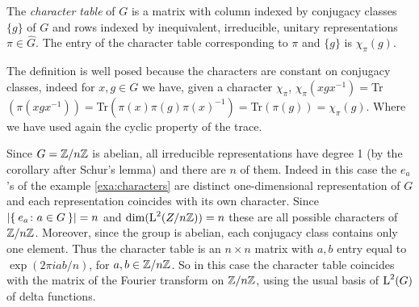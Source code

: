 \begin{defn}
The \emph{character table} of $G$ is a matrix with column indexed by conjugacy classes $\{g\}$ of $G$ and rows indexed by inequivalent, irreducible, unitary representations $\pi \in \hat{G}$. The entry of   the character table corresponding to $\pi$ and $\{g\}$ is $\chi_\pi(g)$.
\end{defn}
\begin{rem}
The definition is well posed because the characters are constant on conjugacy classes, indeed for $x,g\in G$ we have, given a character $\chi_\pi$, $\chi_\pi(xgx^{-1})=$Tr$(\pi(xgx^{-1}))=$Tr$(\pi(x)\pi(g)\pi(x)^{-1})=$Tr$(\pi(g))=\chi_\pi(g)$.
Where we have used again the cyclic property of the trace.
\end{rem}
\begin{exmp}[$\Z/{n\Z}$]
Since $G={\mathbb Z}/{n{\mathbb Z}}$ is abelian, all irreducible representations  have  degree  1 (by the corollary after Schur's lemma)  and  there  are $n$ of them. Indeed in this case  the $e_a$'s of the example \ref{exa:characters}  are  distinct one-dimensional representation of $G$ and each representation coincides with its own character. Since $\lvert\Set{e_a\colon a \in G}\rvert= n $ and $\dim(\operatorname{L}^{2}(Z/{n{\mathbb Z}}))=n$ these are all possible characters of $\Z/{n\Z}$. Moreover, since the group is abelian, each conjugacy class contains only one element. Thus the character table is an $n\times n$ matrix with $a,b$ entry equal to  $\exp(2\pi iab/n)$, for $a,b \in {\mathbb Z}/{n{\mathbb Z}}$. So in this case the character table coincides with the matrix of the Fourier transform on  $\Z/{n\Z}$, using the usual basis of $\operatorname{L}^{2}(G)$ of delta functions.	
\end{exmp}

